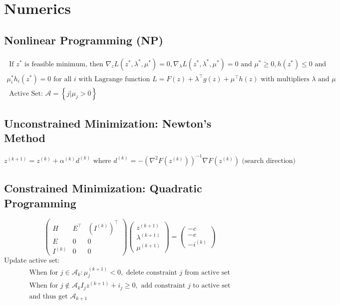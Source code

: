 \documentclass[english]{latex4ei/latex4ei_sheet}
\begin{document}
\section{Numerics}
\begin{sectionbox}

\subsection{Nonlinear Programming (NP)}
$$
\begin{array}{l}{\text { If } z^{*} \text { is feasible minimum, then } \nabla_{z} L\left(z^{*}, \lambda^{*}, \mu^{*}\right)=0, \nabla_{\lambda} L\left(z^{*}, \lambda^{*}, \mu^{*}\right)=0 \text { and } \mu^{*} \geq 0, h\left(z^{*}\right) \leq 0 \text { and }} \\ {\mu_{i}^{*} h_{i}\left(z^{*}\right)=0 \text { for all } i \text { with Lagrange function } L=F(z)+\lambda^{\top} g(z)+\mu^{\top} h(z) \text { with multipliers } \lambda \text { and } \mu} \\ {\text { Active Set: } \mathcal{A}=\left\{j | \mu_{j}>0\right\}}\end{array}
$$

\subsection{Unconstrained Minimization: Newton's Method}
$$
z^{(k+1)}=z^{(k)}+\alpha^{(k)} d^{(k)} \text { where } d^{(k)}=-\left(\nabla^{2} F\left(z^{(k)}\right)\right)^{-1} \nabla F\left(z^{(k)}\right) \text { (search direction) }
$$

\subsection{Constrained Minimization: Quadratic Programming}
$$
\left(\begin{array}{ccc}{H} & {E^{\top}} & {\left(I^{(k)}\right)^{\top}} \\ {E} & {0} & {0} \\ {I^{(k)}} & {0} & {0}\end{array}\right)\left(\begin{array}{l}{z^{(k+1)}} \\ {\lambda^{(k+1)}} \\ {\mu^{(k+1)}}\end{array}\right)=\left(\begin{array}{c}{-c} \\ {-e} \\ {-i^{(k)}}\end{array}\right)
$$
Update active set:
$$
\begin{array}{l}{\text { When for } j \in \mathcal{A}_{k}: \mu_{j}^{(k+1)}<0, \text { delete constraint } j \text { from active set }} \\ {\text { When for } j \notin \mathcal{A}_{k} I_{j} z^{(k+1)}+i_{j} \geq 0, \text { add constraint } j \text { to active set }} \\ {\text { and thus get } \mathcal{A}_{k+1}}\end{array}
$$


\end{sectionbox}
\end{document}

